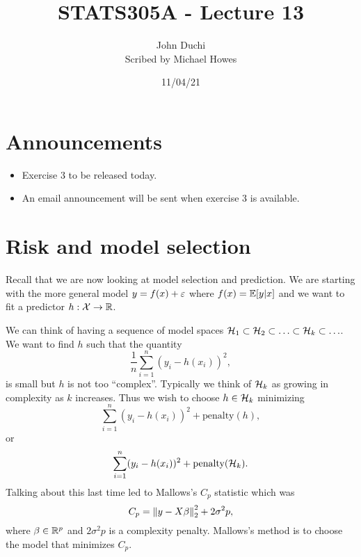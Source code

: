 


\newcommand{\Ss}{\mathcal{S}}

\title{STATS305A - Lecture 13}
\author{John Duchi\\ Scribed by Michael Howes}
\date{11/04/21}

\pagestyle{fancy}
\fancyhf{}


\maketitle
\tableofcontents

\section{Announcements}
\begin{itemize}
    \item Exercise 3 to be released today. 
    \item An email announcement will be sent when exercise 3 is available.
\end{itemize}
\section{Risk and model selection}
Recall that we are now looking at model selection and prediction. We are starting with the more general model $y = f(x)+\varepsilon$ where $f(x) = {\mathbb{E}}[y|x]$ and we want to fit a predictor $h:{\mathcal{X}} \to {\mathbb R}$. 

We can think of having a sequence of model spaces $\mathcal{H}_1 \subset \mathcal{H}_2 \subset \ldots \subset \mathcal{H}_k \subset \ldots$. We want to find $h$ such that the quantity 
\[\frac{1}{n}\sum_{i=1}^n(y_i-h(x_i))^2,\]
is small but $h$ is not too ``complex''. Typically we think of $\mathcal{H}_k$ as growing in complexity as $k$ increases. Thus we wish to choose $h \in \mathcal{H}_k$ minimizing
\[\sum_{i=1}^n(y_i-h(x_i))^2+\text{penalty}(h), \]
or 
\[\sum_{i=1}^n(y_i-h(x_i))^2+\text{penalty}(\mathcal{H}_k). \]
Talking about this last time led to Mallows's $C_p$ statistic which was
\[C_p = \left\|y-X\beta\right\|_2^2 + 2\sigma^2p, \]
where $\beta \in {\mathbb R}^p$ and $2\sigma^2p$ is a complexity penalty. Mallows's method is to choose the model that minimizes $C_p$.
